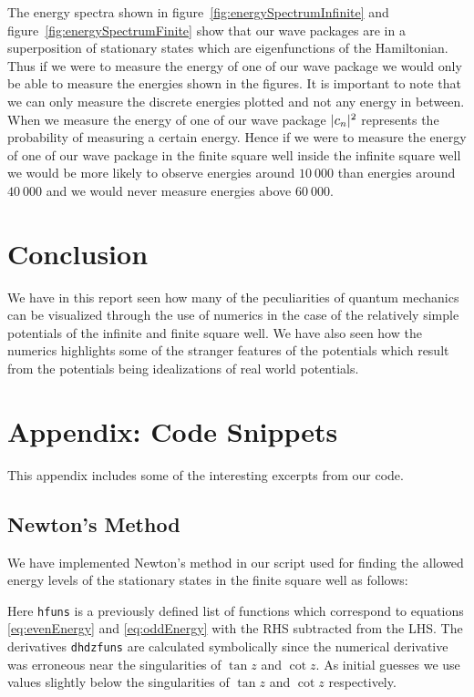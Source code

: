 \documentclass[12pt,a4paper]{article}
\DeclarePairedDelimiter{\abs}{\lvert}{\rvert}
\begin{document}
The energy spectra shown in figure~\ref{fig:energySpectrumInfinite} and figure~\ref{fig:energySpectrumFinite} show that our wave packages are in a superposition of stationary states which are eigenfunctions of the Hamiltonian. Thus if we were to measure the energy of one of our wave package we would only be able to measure the energies shown in the figures. It is important to note that we can only measure the discrete energies plotted and not any energy in between. When we measure the energy of one of our wave package $\abs{c_n}^2$ represents the probability of measuring a certain energy. Hence if we were to measure the energy of one of our wave package in the finite square well inside the infinite square well we would be more likely to observe energies around $10~000$ than energies around $40~000$ and we would never measure energies above $60~000$.

\section{Conclusion}
We have in this report seen how many of the peculiarities of quantum mechanics can be visualized through the use of numerics in the case of the relatively simple potentials of the infinite and finite square well. We have also seen how the numerics highlights some of the stranger features of the potentials which result from the potentials being idealizations of real world potentials.

\newpage
\appendix
\section{Appendix: Code Snippets}
This appendix includes some of the interesting excerpts from our code.
\subsection{Newton's Method} \label{app:newton}
We have implemented Newton's method in our script used for finding the allowed energy levels of the stationary states in the finite square well as follows:

Here \lstinline{hfuns} is a previously defined list of functions which correspond to equations \eqref{eq:evenEnergy} and \eqref{eq:oddEnergy} with the RHS subtracted from the LHS. The derivatives \lstinline{dhdzfuns} are calculated symbolically since the numerical derivative was erroneous near the singularities of $\tan z$ and $\cot z$. As initial guesses we use values slightly below the singularities of $\tan z$ and $\cot z$ respectively.
\end{document}
